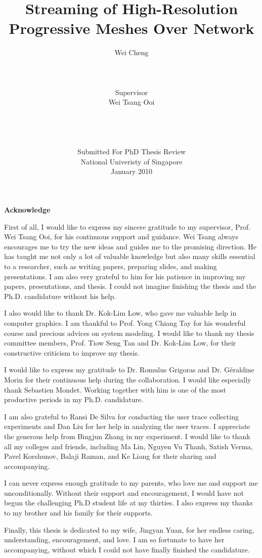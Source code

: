 \documentclass[11pt, a4paper]{report}
\title{Streaming of High-Resolution Progressive Meshes Over Network}
\author{Wei Cheng\\
\\
\\
\\
Supervisor\\
Wei Tsang Ooi
\\
\\
\\
\\
\\
Submitted For PhD Thesis Review\\
National Univeristy of Singapore\\
January 2010}
\newcommand\acknowledgename{Acknowledge}
\newenvironment{acknowledge}%
    {\cleardoublepage \null \vfill
    \begin{center}%
         \bfseries \acknowledgename
    \end{center}}%
    {\vfill \null}
\begin{document}
\maketitle
\doublespacing
{}
   
\begin{acknowledge}
    First of all, I would like to express my sincere gratitude to my supervisor, Prof. Wei Tsang Ooi, for his continuous support and guidance. 
    Wei Tsang always encourages me to try the new ideas and guides me to the promising direction. He has taught me not only a lot of valuable knowledge
    but also many skills essential to a researcher, such as writing papers, preparing slides, and making presentations. 
    I am also very grateful to him for his patience in improving my papers, presentations, and thesis. 
    I could not imagine finishing the thesis and the Ph.D. candidature without his help.

    I also would like to thank Dr. Kok-Lim Low, who gave me valuable help in computer graphics. I am thankful to Prof. Yong Chiang Tay for his
    wonderful course and precious advices on system modeling. I would like to thank my thesis committee members, Prof. Tiow Seng Tan and Dr. Kok-Lim Low, 
    for their constructive criticism to improve my thesis.

    I would like to express my gratitude to Dr. Romulus Grigoras and Dr. G\'{e}raldine Morin for their continuous help during the collaboration. I would
    like especially thank Sebastien Mondet. Working together with him is one of the most productive periods in my Ph.D. candidature. 

    I am also grateful to Ransi De Silva for conducting the user trace collecting experiments and Dan Liu for her help in analyzing the user traces.
    I appreciate the generous help from Bingjun Zhang in my experiment. 
    I would like to thank all my colleges and friends, including Ma Lin, Nguyen Vu Thanh, Satish Verma, Pavel Korshunov, Balaji Raman, and Ke Liang for their
    sharing and accompanying.

    I can never express enough gratitude to my parents, who love me and support me unconditionally. Without their support and encouragement, I would have not
    begun the challenging Ph.D student life at my thirties. I also express my thanks to my brother and his family for their supports. 
    
    Finally, this thesis is dedicated to my wife, Jingyan Yuan, for her endless caring, understanding, encouragement, and love. I am so fortunate to have her
    accompanying, without which I could not have finally finished the candidature.

\end{acknowledge}
\tableofcontents
\listoffigures
\listoftables







\appendix
\end{document}
